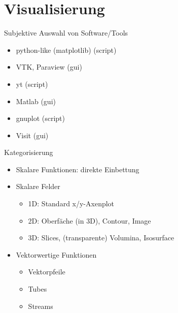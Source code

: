 \documentclass[hyperref={xetex}]{beamer}
\begin{document}
\section{Visualisierung}

\begin{frame}{Subjektive Auswahl von Software/Tools}
  \begin{itemize}
    \item python-like (matplotlib) (script)
    \item VTK, Paraview (gui)
 \item yt (script)
 \item Matlab (gui)
 \item gnuplot (script) 
 \item Visit (gui)
  \end{itemize}
  
\end{frame}

\begin{frame}{Kategorisierung}
  \begin{itemize}
    \item Skalare Funktionen: direkte Einbettung
    \item Skalare Felder
      \begin{itemize}
        \item 1D: Standard x/y-Axenplot
       \item 2D: Oberfäche (in 3D), Contour, Image
        \item 3D: Slices, (transparente) Volumina, Isosurface
      \end{itemize}
   \item Vektorwertige Funktionen
     \begin{itemize}
       \item  Vektorpfeile
       \item Tubes
       \item Streams
     \end{itemize}
 \end{itemize}
\end{frame}

\end{document}
